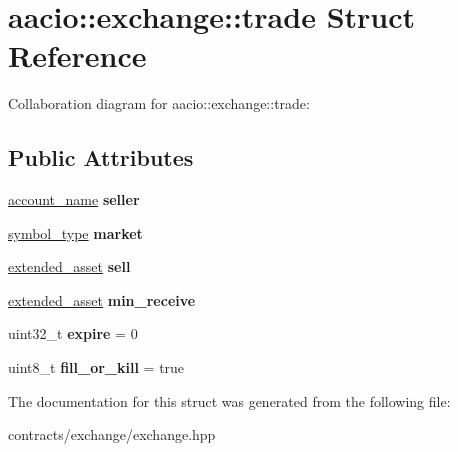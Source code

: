 \hypertarget{structaacio_1_1exchange_1_1trade}{}\section{aacio\+:\+:exchange\+:\+:trade Struct Reference}
\label{structaacio_1_1exchange_1_1trade}


Collaboration diagram for aacio\+:\+:exchange\+:\+:trade\+:
\subsection*{Public Attributes}
\begin{DoxyCompactItemize}
\item 
\mbox{\label{structaacio_1_1exchange_1_1trade_a3679ff8f5fdf01424d6b7eec6d964fa1}} 
\mbox{\hyperlink{structaacio_1_1chain_1_1name}{account\+\_\+name}} {\bfseries seller}
\item 
\mbox{\label{structaacio_1_1exchange_1_1trade_a3713bb82ddc4d79a7dfe3b1da3d0cf0d}} 
\mbox{\hyperlink{structaacio_1_1symbol__type}{symbol\+\_\+type}} {\bfseries market}
\item 
\mbox{\label{structaacio_1_1exchange_1_1trade_a59c75c855df1766606f98133c92492e4}} 
\mbox{\hyperlink{structaacio_1_1extended__asset}{extended\+\_\+asset}} {\bfseries sell}
\item 
\mbox{\label{structaacio_1_1exchange_1_1trade_ada5909bda4a41d758af39706636af686}} 
\mbox{\hyperlink{structaacio_1_1extended__asset}{extended\+\_\+asset}} {\bfseries min\+\_\+receive}
\item 
\mbox{\label{structaacio_1_1exchange_1_1trade_ae7f13daa56d28eea1e0bfe7674e22415}} 
uint32\+\_\+t {\bfseries expire} = 0
\item 
\mbox{\label{structaacio_1_1exchange_1_1trade_a45458f68c9e169f86e89fc70b6de4e15}} 
uint8\+\_\+t {\bfseries fill\+\_\+or\+\_\+kill} = true
\end{DoxyCompactItemize}


The documentation for this struct was generated from the following file\+:\begin{DoxyCompactItemize}
\item 
contracts/exchange/exchange.\+hpp\end{DoxyCompactItemize}
